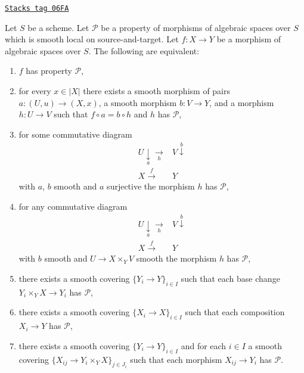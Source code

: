 \begin{lemma}
\label{spaces-descent-lemma-local-source-target-characterize}
\href{https://stacks.math.columbia.edu/tag/06FA}{\texttt{Stacks tag 06FA}}

Let $S$ be a scheme.
Let $\mathcal{P}$ be a property of morphisms of algebraic spaces over $S$
which is smooth local on source-and-target. Let $f : X \to Y$ be a morphism
of algebraic spaces over $S$. The following are equivalent:
\begin{enumerate}
\item[(a)] $f$ has property $\mathcal{P}$,
\item[(b)] for every $x \in |X|$ there exists a smooth morphism of pairs
$a : (U, u) \to (X, x)$, a smooth morphism $b : V \to Y$, and
a morphism $h : U \to V$ such that $f \circ a = b \circ h$ and
$h$ has $\mathcal{P}$,
\item[(c)] for some commutative diagram
$$
\begin{array}{cc}U \underset{a}{\downarrow}\underset{h}{\longrightarrow} & V \overset{b}{\downarrow} \\ X \overset{f}{\longrightarrow} & Y\end{array}
$$
with $a$, $b$ smooth and $a$ surjective the morphism $h$ has $\mathcal{P}$,
\item[(d)] for any commutative diagram
$$
\begin{array}{cc}U \underset{a}{\downarrow}\underset{h}{\longrightarrow} & V \overset{b}{\downarrow} \\ X \overset{f}{\longrightarrow} & Y\end{array}
$$
with $b$ smooth and $U \to X \times_Y V$ smooth
the morphism $h$ has $\mathcal{P}$,
\item[(e)] there exists a smooth covering $\{Y_i \to Y\}_{i \in I}$ such
that each base change $Y_i \times_Y X \to Y_i$ has $\mathcal{P}$,
\item[(f)] there exists a smooth covering $\{X_i \to X\}_{i \in I}$ such
that each composition $X_i \to Y$ has $\mathcal{P}$,
\item[(g)] there exists a smooth covering $\{Y_i \to Y\}_{i \in I}$ and
for each $i \in I$ a smooth covering
$\{X_{ij} \to Y_i \times_Y X\}_{j \in J_i}$ such that each morphism
$X_{ij} \to Y_i$ has $\mathcal{P}$.
\end{enumerate}
\end{lemma}

